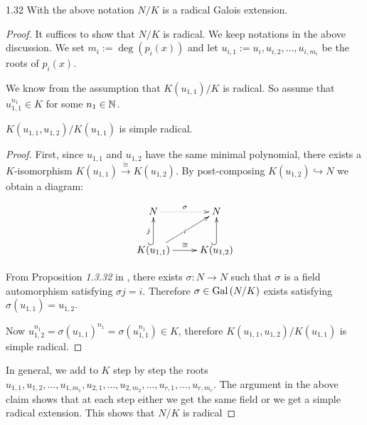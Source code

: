 \documentclass[twoside = false,	%
		headsepline,		%
		parskip = true,
		]{scrbook}						%
\begin{document}
    \begin{lemma}{}{1.32}
        With the above notation $N/K$ is a radical Galois extension.
    \end{lemma}
    
    \begin{proof}
        It suffices to show that $N/K$ is radical. We keep notations in the above discussion. We set $m_i:=\deg\left(p_i(x)\right)$ and let $u_{i,1} := u_i, u_{i,2},\dots, u_{i,m_i}$ be the roots of $p_i(x)$.
        
        We know from the assumption that $K(u_{1,1})/K$ is radical. So assume that $u_{1,1}^{n_1} \in K$ for some $n_1 \in \mathbb N$.
        
        \begin{claim*}{}{}
            $K(u_{1,1} ,u_{1,2})/K(u_{1,1})$ is simple radical.
        \end{claim*}
        \begin{proof}
            First, since $u_{1,1}$ and $u_{1,2}$ have the same minimal polynomial, there exists a $K$-isomorphism $K(u_{1,1}) \overset{\cong}{\rightarrow} K(u_{1,2})$. By post-composing $K(u_{1,2}) \hookrightarrow N$ we obtain a diagram:
            
            \begin{equation*}
                \xymatrix{
                    N \ar@{.>}[r]^{\sigma} & N \\
                    K(u_{1,1})\ar@{^{(}->}^{j}[u] \ar^{\cong}[r]\ar | {i}[ur] & K(u_{1,2})\ar@{^{(}->}[u]
                }
            \end{equation*}
            
            From Proposition \textit{1.3.32} in \cite{Cobra}, there exists $\sigma: N \rightarrow N$ such that $\sigma$ is a field automorphism satisfying $\sigma j = i$. Therefore $\sigma \in \mathrm{Gal}\left( N/K\right)$ exists satisfying $\sigma(u_{1,1}) = u_{1,2}$.
            
            Now $u_{1,2}^{n_1} = \sigma(u_{1,1})^{n_1} = \sigma(u_{1,1}^{n_1}) \in K$, therefore $K(u_{1,1},u_{1,2})/K(u_{1,1})$ is simple radical.
        \end{proof}
        In general, we add to $K$ step by step the roots $u_{1,1},u_{1,2},\dots,u_{1,m_1},u_{2,1},\dots,u_{2,m_2}, \dots, u_{r,1}, \dots, u_{r,m_r}$. The argument in the above claim shows that at each step either we get the same field or we get a simple radical extension. This shows that $N/K$ is radical
    \end{proof}
    
\end{document}
